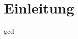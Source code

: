 \section{Einleitung}

\lipsum[1]\newline

\gls{gcd}

\subsection{}
\subsection{}
\subsection{}
\subsection{}
